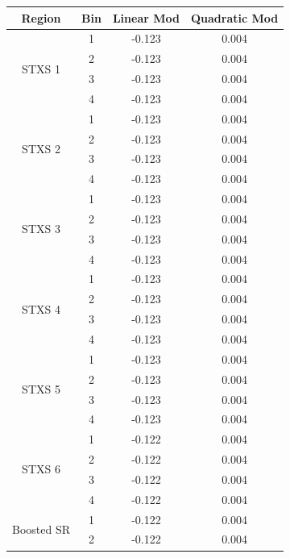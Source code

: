 \begin{tabular}{|c|c|c|c|}
\hline
\textbf{Region} & \textbf{Bin} & \textbf{Linear Mod} & \textbf{Quadratic Mod} \\
\hline
\multirow{4}{*}{STXS 1} & 1 & -0.123 & 0.004 \\
 & 2 & -0.123 & 0.004 \\
 & 3 & -0.123 & 0.004 \\
 & 4 & -0.123 & 0.004 \\
\hline
\multirow{4}{*}{STXS 2} & 1 & -0.123 & 0.004 \\
 & 2 & -0.123 & 0.004 \\
 & 3 & -0.123 & 0.004 \\
 & 4 & -0.123 & 0.004 \\
\hline
\multirow{4}{*}{STXS 3} & 1 & -0.123 & 0.004 \\
 & 2 & -0.123 & 0.004 \\
 & 3 & -0.123 & 0.004 \\
 & 4 & -0.123 & 0.004 \\
\hline
\multirow{4}{*}{STXS 4} & 1 & -0.123 & 0.004 \\
 & 2 & -0.123 & 0.004 \\
 & 3 & -0.123 & 0.004 \\
 & 4 & -0.123 & 0.004 \\
\hline
\multirow{4}{*}{STXS 5} & 1 & -0.123 & 0.004 \\
 & 2 & -0.123 & 0.004 \\
 & 3 & -0.123 & 0.004 \\
 & 4 & -0.123 & 0.004 \\
\hline
\multirow{4}{*}{STXS 6} & 1 & -0.122 & 0.004 \\
 & 2 & -0.122 & 0.004 \\
 & 3 & -0.122 & 0.004 \\
 & 4 & -0.122 & 0.004 \\
\hline
\multirow{2}{*}{Boosted SR} & 1 & -0.122 & 0.004 \\
 & 2 & -0.122 & 0.004 \\
\hline
\end{tabular}